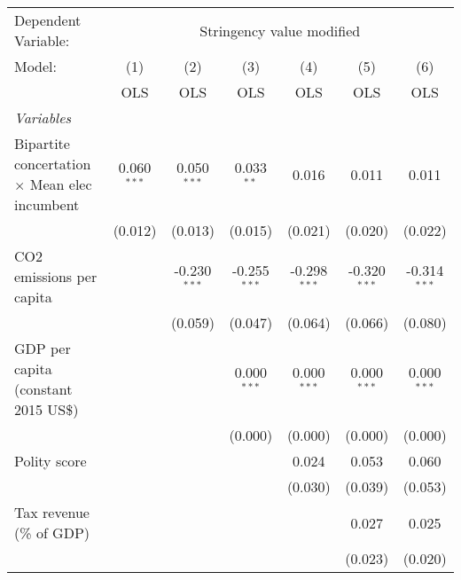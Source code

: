 
\begingroup
\centering
\begin{tabular}{lcccccc}
   \toprule
   Dependent Variable: & \multicolumn{6}{c}{Stringency value modified}\\
   Model:                                               & (1)           & (2)            & (3)            & (4)            & (5)            & (6)\\  
                                                        &  OLS          & OLS            & OLS            & OLS            & OLS            & OLS\\  
   \midrule
   \emph{Variables}\\
   Bipartite concertation $\times$ Mean elec incumbent  & 0.060$^{***}$ & 0.050$^{***}$  & 0.033$^{**}$   & 0.016          & 0.011          & 0.011\\   
                                                        & (0.012)       & (0.013)        & (0.015)        & (0.021)        & (0.020)        & (0.022)\\   
   CO2 emissions per capita                             &               & -0.230$^{***}$ & -0.255$^{***}$ & -0.298$^{***}$ & -0.320$^{***}$ & -0.314$^{***}$\\   
                                                        &               & (0.059)        & (0.047)        & (0.064)        & (0.066)        & (0.080)\\   
   GDP per capita (constant 2015 US\$)                  &               &                & 0.000$^{***}$  & 0.000$^{***}$  & 0.000$^{***}$  & 0.000$^{***}$\\   
                                                        &               &                & (0.000)        & (0.000)        & (0.000)        & (0.000)\\   
   Polity score                                         &               &                &                & 0.024          & 0.053          & 0.060\\   
                                                        &               &                &                & (0.030)        & (0.039)        & (0.053)\\   
   Tax revenue (\% of GDP)                              &               &                &                &                & 0.027          & 0.025\\   
                                                        &               &                &                &                & (0.023)        & (0.020)\\   

\end{tabular}
